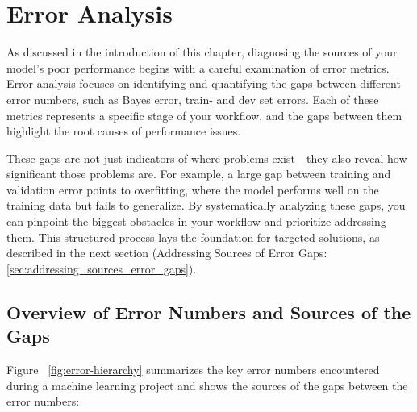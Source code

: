 \documentclass[12pt,openany]{book}
\begin{document}
\section{Error Analysis} \label{sec:error_analysis}

As discussed in the introduction of this chapter, diagnosing the sources of your model’s poor performance begins with a careful examination of error metrics. Error analysis focuses on identifying and quantifying the gaps between different error numbers, such as Bayes error, train- and dev set errors. Each of these metrics represents a specific stage of your workflow, and the gaps between them highlight the root causes of performance issues. \newline

These gaps are not just indicators of where problems exist—they also reveal how significant those problems are. For example, a large gap between training and validation error points to overfitting, where the model performs well on the training data but fails to generalize. By systematically analyzing these gaps, you can pinpoint the biggest obstacles in your workflow and prioritize addressing them. This structured process lays the foundation for targeted solutions, as described in the next section (Addressing Sources of Error Gaps: \ref{sec:addressing_sources_error_gaps}).

\subsection{Overview of Error Numbers and Sources of the Gaps}

Figure ~\ref{fig:error-hierarchy} summarizes the key error numbers encountered during a machine learning project and shows the sources of the gaps between the error numbers:
\end{document}

